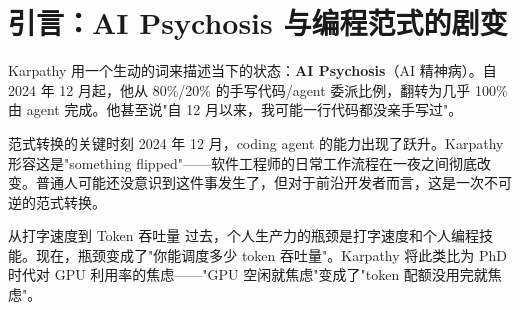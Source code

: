 \section{引言：AI Psychosis 与编程范式的剧变}

Karpathy 用一个生动的词来描述当下的状态：\textbf{AI Psychosis}（AI 精神病）。自 2024 年 12 月起，他从 80\%/20\% 的手写代码/agent 委派比例，翻转为几乎 100\% 由 agent 完成。他甚至说"自 12 月以来，我可能一行代码都没亲手写过"。

\begin{importantbox}{范式转换的关键时刻}
2024 年 12 月，coding agent 的能力出现了跃升。Karpathy 形容这是"something flipped"——软件工程师的日常工作流程在一夜之间彻底改变。普通人可能还没意识到这件事发生了，但对于前沿开发者而言，这是一次不可逆的范式转换。
\end{importantbox}

\begin{knowledgebox}{从打字速度到 Token 吞吐量}
过去，个人生产力的瓶颈是打字速度和个人编程技能。现在，瓶颈变成了"你能调度多少 token 吞吐量"。Karpathy 将此类比为 PhD 时代对 GPU 利用率的焦虑——"GPU 空闲就焦虑"变成了"token 配额没用完就焦虑"。
\end{knowledgebox}


